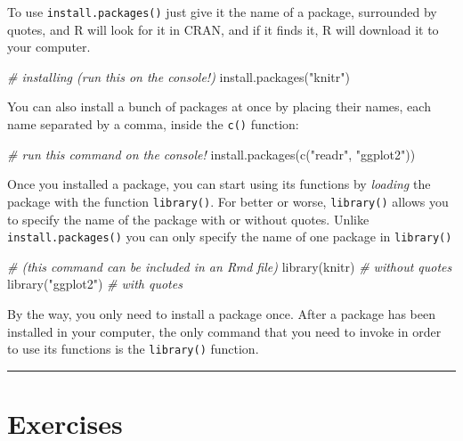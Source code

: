 \documentclass[
]{book}
\newenvironment{Shaded}{\begin{snugshade}}{\end{snugshade}}
\newcommand{\CommentTok}[1]{\textcolor[rgb]{0.56,0.35,0.01}{\textit{#1}}}
\newcommand{\FunctionTok}[1]{\textcolor[rgb]{0.00,0.00,0.00}{#1}}
\newcommand{\NormalTok}[1]{#1}
\newcommand{\StringTok}[1]{\textcolor[rgb]{0.31,0.60,0.02}{#1}}
\begin{document}
To use \texttt{install.packages()} just give it the name of a package, surrounded by
quotes, and R will look for it in CRAN, and if it finds it, R will download it
to your computer.

\begin{Shaded}
\begin{Highlighting}[]
\CommentTok{\# installing (run this on the console!)}
\FunctionTok{install.packages}\NormalTok{(}\StringTok{"knitr"}\NormalTok{)}
\end{Highlighting}
\end{Shaded}

You can also install a bunch of packages at once by placing their names,
each name separated by a comma, inside the \texttt{c()} function:

\begin{Shaded}
\begin{Highlighting}[]
\CommentTok{\# run this command on the console!}
\FunctionTok{install.packages}\NormalTok{(}\FunctionTok{c}\NormalTok{(}\StringTok{"readr"}\NormalTok{, }\StringTok{"ggplot2"}\NormalTok{))}
\end{Highlighting}
\end{Shaded}

Once you installed a package, you can start using its functions by \emph{loading}
the package with the function \texttt{library()}. For better or worse, \texttt{library()}
allows you to specify the name of the package with or without quotes. Unlike
\texttt{install.packages()} you can only specify the name of one package in \texttt{library()}

\begin{Shaded}
\begin{Highlighting}[]
\CommentTok{\# (this command can be included in an Rmd file)}
\FunctionTok{library}\NormalTok{(knitr)      }\CommentTok{\# without quotes}
\FunctionTok{library}\NormalTok{(}\StringTok{"ggplot2"}\NormalTok{)  }\CommentTok{\# with quotes}
\end{Highlighting}
\end{Shaded}

By the way, you only need to install a package once. After a package has been
installed in your computer, the only command that you need to invoke in order
to use its functions is the \texttt{library()} function.

\begin{center}\rule{0.5\linewidth}{0.5pt}\end{center}

\hypertarget{exercises}{%
\section{Exercises}\label{exercises}}
\end{document}
